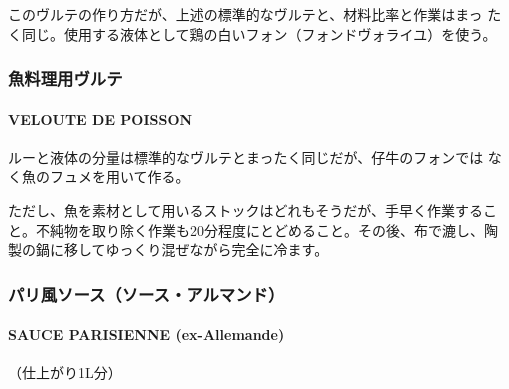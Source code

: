 \documentclass[twoside,12Q,b5j]{escoffierltjsbook}
\begin{document}
このヴルテの作り方だが、上述の標準的なヴルテと、材料比率と作業はまっ
たく同じ。使用する液体として鶏の白いフォン（フォンドヴォライユ）を使う。

\vspace*{1.7\zw}

\subsubsection{魚料理用ヴルテ}\label{ux9b5aux6599ux7406ux7528ux30f4ux30ebux30c6}

\paragraph{VELOUTE DE POISSON}\label{veloute-de-poisson}


ルーと液体の分量は標準的なヴルテとまったく同じだが、仔牛のフォンでは
なく魚のフュメを用いて作る。

ただし、魚を素材として用いるストックはどれもそうだが、手早く作業するこ
と。不純物を取り除く作業も20分程度にとどめること。その後、布で漉し、陶
製の鍋に移してゆっくり混ぜながら完全に冷ます。

\vspace*{1.7\zw}

\subsubsection{パリ風ソース（ソース・アルマンド）}\label{ux30d1ux30eaux98a8ux30bdux30fcux30b9ux30bdux30fcux30b9ux30a2ux30ebux30deux30f3ux30c9}

\paragraph{SAUCE PARISIENNE (ex-Allemande)}\label{sauce-parisienne}


（仕上がり1L分）
\end{document}
